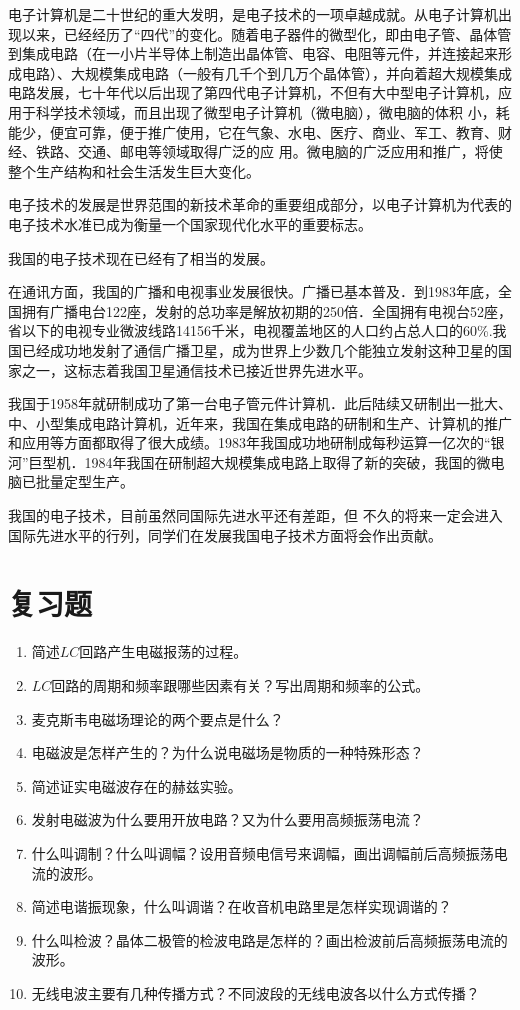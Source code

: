 电子计算机是二十世纪的重大发明，是电子技术的一项卓越成就。从电子计算机出现以来，已经经历了“四代”的变化。随着电子器件的微型化，即由电子管、晶体管到集成电路（在一小片半导体上制造出晶体管、电容、电阻等元件，并连接起来形成电路）、大规模集成电路（一般有几千个到几万个晶体管），并向着超大规模集成电路发展，七十年代以后出现了第四代电子计算机，不但有大中型电子计算机，应用于科学技术领域，而且出现了微型电子计算机（微电脑），微电脑的体积
小，耗能少，便宜可靠，便于推广使用，它在气象、水电、医疗、商业、军工、教育、财经、铁路、交通、邮电等领域取得广泛的应
用。微电脑的广泛应用和推广，将使整个生产结构和社会生活发生巨大变化。

电子技术的发展是世界范围的新技术革命的重要组成部分，以电子计算机为代表的电子技术水准已成为衡量一个国家现代化水平的重要标志。

我国的电子技术现在已经有了相当的发展。

在通讯方面，我国的广播和电视事业发展很快。广播已基本普及．到1983年底，全国拥有广播电台122座，发射的总功率是解放初期的250倍．全国拥有电视台52座，省以下的电视专业微波线路14156千米，电视覆盖地区的人口约占总人口的60\%.我国已经成功地发射了通信广播卫星，成为世界上少数几个能独立发射这种卫星的国家之一，这标志着我国卫星通信技术已接近世界先进水平。

我国于1958年就研制成功了第一台电子管元件计算机．此后陆续又研制出一批大、中、小型集成电路计算机，近年来，我国在集成电路的研制和生产、计算机的推广和应用等方面都取得了很大成绩。1983年我国成功地研制成每秒运算一亿次的“银河”巨型机．1984年我国在研制超大规模集成电路上取得了新的突破，我国的微电脑已批量定型生产。

我国的电子技术，目前虽然同国际先进水平还有差距，但
不久的将来一定会进入国际先进水平的行列，同学们在发展我国电子技术方面将会作出贡献。

\section*{复习题}
\begin{enumerate}
	\item 简述$LC$回路产生电磁报荡的过程。
	\item $LC$回路的周期和频率跟哪些因素有关？写出周期和频率的公式。
	\item 麦克斯韦电磁场理论的两个要点是什么？
	\item 电磁波是怎样产生的？为什么说电磁场是物质的一种特殊形态？
	\item 简述证实电磁波存在的赫兹实验。
	\item 发射电磁波为什么要用开放电路？又为什么要用高频振荡电流？
	\item 什么叫调制？什么叫调幅？设用音频电信号来调幅，画出调幅前后高频振荡电流的波形。
	\item 简述电谐振现象，什么叫调谐？在收音机电路里是怎样实现调谐的？
	\item 什么叫检波？晶体二极管的检波电路是怎样的？画出检波前后高频振荡电流的波形。
	\item 无线电波主要有几种传播方式？不同波段的无线电波各以什么方式传播？
\end{enumerate}

